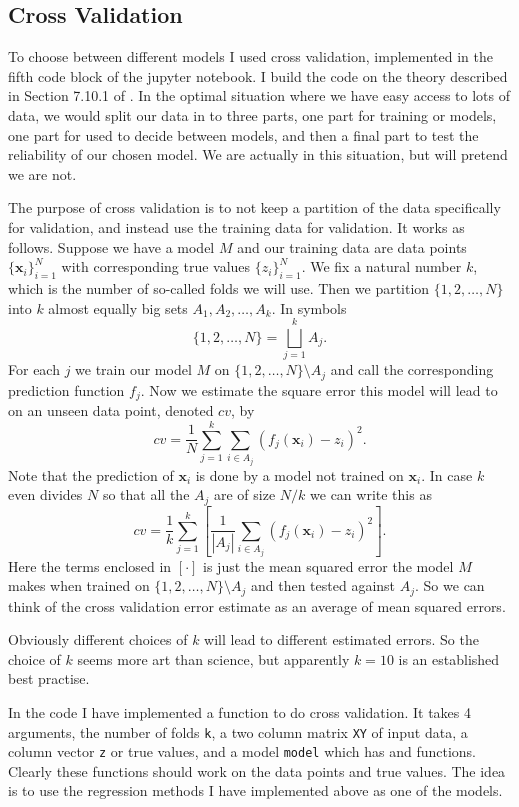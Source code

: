 \documentclass[parskip=half]{scrartcl}
\theoremstyle{definition}
\theoremstyle{remark}
\newcommand{\vect}[1]{{\bm{#1}}}
\newcommand{\funcname}[1]{{\color{blue}{\texttt{#1}}}}
\newcommand{\varname}[1]{\texttt{#1}}
\begin{document}
\subsection{Cross Validation}

To choose between different models I used cross validation, implemented in the fifth code block of the jupyter notebook. 
I build the code on the theory described in Section 7.10.1 of \cite{htf:esl}. 
In the optimal situation where we have easy access to lots of data, we would split our data in to three parts, one part for training or models, one part for used to decide between models, and then a final part to test the reliability of our chosen model. 
We are actually in this situation, but will pretend we are not. 

The purpose of cross validation is to not keep a partition of the data specifically for validation, and instead use the training data for validation. 
It works as follows.
Suppose we have a model $M$ and our training data are data points $\{\vect{x}_i\}_{i=1}^N$ with corresponding true values $\{z_i\}_{i=1}^N$.
We fix a natural number $k$, which is the number of so-called folds we will use.  
Then we partition $\{1,2,\ldots, N\}$ into $k$ almost equally big sets $A_1, A_2, \ldots, A_k$.
In symbols 
\[
	\{1,2,\ldots, N\} = \bigsqcup_{j=1}^k A_j.
\]  
For each $j$ we train our model $M$ on $\{1,2,\ldots, N\} \setminus A_j$ and call the corresponding prediction function $f_j$. 
Now we estimate the square error this model will lead to on an unseen data point, denoted $cv$, by 
\[
	cv = \frac{1}{N} \sum_{j=1}^k \sum_{i \in A_j} (f_j(\vect{x}_i) - z_i)^2. 
\]
Note that the prediction of $\vect{x}_i$ is done by a model not trained on $\vect{x}_i$.
In case $k$ even divides $N$ so that all the $A_j$ are of size $N/k$ we can write this as 
\[
	cv = \frac{1}{k} \sum_{j=1}^k \left[ \frac{1}{|A_j|} \sum_{i \in A_j} (f_j(\vect{x}_i) - z_i)^2 \right].
\]
Here the terms enclosed in $[\cdot]$ is just the mean squared error the model $M$ makes when trained on $\{1,2,\ldots, N\} \setminus A_j$ and then tested against $A_j$.
So we can think of the cross validation error estimate as an average of mean squared errors. 

Obviously different choices of $k$ will lead to different estimated errors. 
So the choice of $k$ seems more art than science, but apparently $k=10$ is an established best practise.

In the code I have implemented a function \funcname{cross{\_}validation} to do cross validation. 
It takes 4 arguments, the number of folds \varname{k}, a two column matrix \varname{XY} of input data, a column vector \varname{z} or true values, and a model \varname{model} which has \funcname{train} and \funcname{predict} functions. 
Clearly these functions should work on the data points and true values. 
The idea is to use the regression methods I have implemented above as one of the models. 
\end{document}
